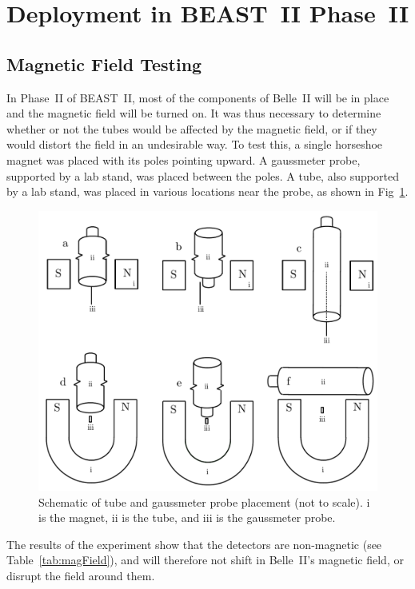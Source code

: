 \section{Deployment in BEAST~II Phase~II}


\subsection{Magnetic Field Testing}

	In Phase~II of BEAST~II, most of the components of Belle~II will be in place and the magnetic field will be turned on. It was thus necessary to determine whether or not the \he tubes would be affected by the magnetic field, or if they would distort the field in an undesirable way. To test this, a single horseshoe magnet was placed with its poles pointing upward. A gaussmeter probe, supported by a lab stand, was placed between the poles. A \he tube, also supported by a lab stand, was placed in various locations near the probe, as shown in Fig~\ref{fig:apparatusSchematic}.

\begin{figure}[htb]
	\centering
	\includegraphics[width=\textwidth]{images/Apparatus_III}
	\caption[Schematic of \he tube and gaussmeter probe placement]{Schematic of \he tube and gaussmeter probe placement (not to scale). i is the magnet, ii is the \he tube, and iii is the gaussmeter probe.}	
	\label{fig:apparatusSchematic}
\end{figure}

The results of the experiment show that the detectors are non-magnetic (see Table~\ref{tab:magField}), and will therefore not shift in Belle~II's magnetic field, or disrupt the field around them.

